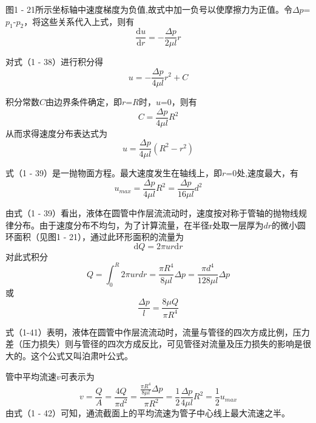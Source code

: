 图1 - 21所示坐标轴中速度梯度为负值,故式中加一负号以使摩擦力为正值。令$\Delta p$=$p_{1}$-$p_{2}$，将这些关系代入上式，则有
\begin{equation}
\frac{\mathrm{d}u}{\mathrm{d}r}=-\frac{\Delta p}{2\mu l}r
\end{equation}

\noindent 对式（1 - 38）进行积分得
\begin{equation*}
u=-\frac{\Delta p}{4\mu l}r^{2}+C
\end{equation*}

\noindent 积分常数$C$由边界条件确定，即$r$=$R$时，$u$=0，则有
\begin{equation*}
C=\frac{\Delta p}{4\mu l}R^{2}
\end{equation*}
从而求得速度分布表达式为
\begin{equation}
u=\frac{\Delta p}{4\mu l}(R^{2}-r^{2})
\end{equation}

\noindent 式（1 - 39）是一抛物面方程。最大速度发生在轴线上，即$r$=0处,速度最大，有
\begin{equation}
u_{max}=\frac{\Delta p}{4\mu l}R^{2}=\frac{\Delta p}{16\mu l}d^{2}
\end{equation}

由式（1 - 39）看出，液体在圆管中作层流流动时，速度按对称于管轴的抛物线规律分布。由于速度分布不均匀，为了计算流量，在半径r处取一层厚为$dr$的微小圆环面积（见图1 - 21），通过此环形面积的流量为
\begin{equation*}
\mathrm{d}Q=2\pi ur\mathrm{d}r
\end{equation*}
对此式积分
\begin{equation}
Q=\int_{0} ^{R}2\pi urdr=\frac{\pi R^{4}}{8\mu l}\Delta p=\frac{\pi d^{4}}{128\mu l}\Delta p
\end{equation}
或
\begin{equation*}
\frac{\Delta p}{l}=\frac{8\mu Q}{\pi R^{4}}
\end{equation*}

式（1-41）表明，液体在圆管中作层流流动时，流量与管径的四次方成比例，压力差（压力损失）则与管径的四次方成反比，可见管径对流量及压力损失的影响是很大的。这个公式又叫泊肃叶公式。

管中平均流速$v$可表示为
\begin{equation}
v=\frac{Q}{A}=\frac{4Q}{\pi d^{2}}=\frac{\frac{\pi R^{4}}{8\mu l}\Delta p}{\pi R^{2}}=\frac{1}{2}\frac{\Delta p}{4\mu l}R^{2}=\frac{1}{2}u_{max}
\end{equation}
由式（1 - 42）可知，通流截面上的平均流速为管子中心线上最大流速之半。

